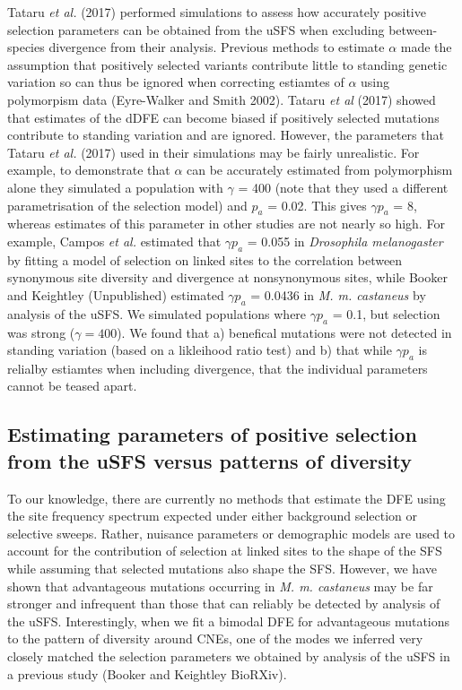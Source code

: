 \documentclass[11pt]{article}
\begin{document}
Tataru \textit{et al.} (2017) performed simulations to assess how accurately positive selection parameters can be obtained from the uSFS when excluding between-species divergence from their analysis. Previous methods to estimate $\alpha$ made the assumption that positively selected variants contribute little  to standing genetic variation so can thus be ignored when correcting estiamtes of $\alpha$ using polymorpism data (Eyre-Walker and Smith 2002). Tataru \textit{et al} (2017) showed  that estimates of the dDFE can become biased if positively selected mutations contribute to standing variation and are ignored. However, the parameters that Tataru \textit{et al.} (2017) used in their simulations may be fairly unrealistic. For example, to demonstrate that $\alpha$ can be accurately estimated from polymorphism alone they simulated a population with $\gamma$ = 400 (note that they used a different parametrisation of the selection model) and $p_a$ = 0.02. This gives $\gamma p_a$ = 8, whereas estimates of this parameter in other studies are not nearly so high. For example, Campos \textit{et al.} estimated that $\gamma p_a$ = 0.055 in \textit{Drosophila melanogaster} by fitting a model of selection on linked sites to the correlation between synonymous site diversity and divergence at nonsynonymous sites, while Booker and Keightley (Unpublished) estimated $\gamma p_a$ = 0.0436 in \textit{M. m. castaneus} by analysis of the uSFS. We simulated populations where $\gamma p_a$ = 0.1, but selection was strong ($\gamma = 400$). We found that a) benefical mutations were not detected in standing variation (based on a likleihood ratio test) and b) that while $\gamma p_a$ is relialby estiamtes when including divergence, that the individual parameters cannot be teased apart. 

\subsection*{Estimating parameters of positive selection from the uSFS versus patterns of diversity}

To our knowledge, there are currently no methods that estimate the DFE using the site frequency spectrum expected under either background selection or selective sweeps. Rather, nuisance parameters or demographic models are used to account for the contribution of selection at linked sites to the shape of the SFS while assuming that selected mutations also shape the SFS. 
However, we have shown that advantageous mutations occurring in \textit{M. m. castaneus} may be far stronger and infrequent than those that can reliably be detected by analysis of the uSFS. Interestingly, when we fit a bimodal DFE for advantageous mutations to the pattern of diversity around CNEs, one of the modes we inferred very closely matched the selection parameters we obtained by analysis of the uSFS in a previous study (Booker and Keightley BioRXiv).
\end{document}
